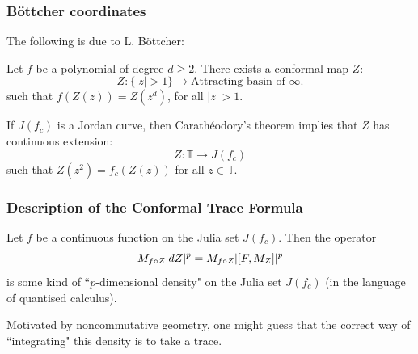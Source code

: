 \documentclass{beamer} %
\theoremstyle{definition} %
\newcommand{\Cplx}{\mathbb{C}}
\newcommand{\Circ}{\mathbb{T}}
\def\qd{\,{\mathchar'26\mkern-12mu d}}
\begin{document}
\begin{frame}\frametitle{B\"ottcher coordinates}
    
    The following is due to L. B\"ottcher:
    \begin{theorem}
        Let $f$ be a polynomial of degree $d \geq 2$. There exists a conformal map $Z$:
        \begin{equation*}
            Z:\{|z| > 1\}\to \text{Attracting basin of }\infty.
        \end{equation*}
        such that $f(Z(z)) = Z(z^d)$, for all $|z| > 1$.
    \end{theorem}
    If $J(f_c)$ is a Jordan curve, then Carath\'eodory's theorem implies that $Z$ has continuous extension:
    \begin{equation*}
        Z:\Circ\to J(f_c)
    \end{equation*}
    such that $Z(z^2) = f_c(Z(z))$ for all $z \in \Circ$.
\end{frame}

\begin{frame}\frametitle{Description of the Conformal Trace Formula}
     Let $f$ be a continuous function on the Julia set $J(f_c)$. Then the operator
     \begin{equation*}
        M_{f\circ Z}|\qd Z|^p = M_{f\circ Z}|[F,M_Z]|^p
     \end{equation*}
     is some kind of ``$p$-dimensional density" on the Julia set $J(f_c)$ (in the language of quantised calculus).
     
     Motivated by noncommutative geometry, one might guess that the correct way of ``integrating" this density is to take a trace.
\end{frame}
\end{document}
